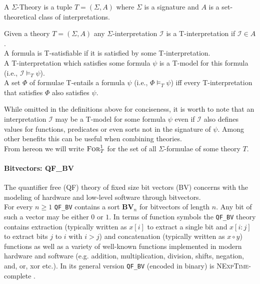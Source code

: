 \begin{definition}
A $\Sigma$-Theory is a tuple $T=\left(\Sigma,A\right)$ where $\Sigma$ is a signature and $A$ is a set-theoretical class of interpretations.
\end{definition}

\begin{definition}
Given a theory $T=\left(\Sigma,A\right)$ any $\Sigma$-interpretation $\mathcal{I}$ is a T-interpretation if $\mathcal{I}\in A$.\\
A formula is T-satisfiable if it is satisfied by some T-interpretation.\\
A T-interpretation which satisfies some formula $\psi$ is a T-model for this formula (i.e., $\mathcal{I}\vDash_T\psi$).\\
A set $\Phi$ of formulae T-entails a formula $\psi$ (i.e., $\Phi\vDash_T\psi$) iff every T-interpretation that satisfies $\Phi$ also satisfies $\psi$.
\end{definition}
While omitted in the definitions above for conciseness, it is worth to note that an interpretation $\mathcal{I}$ may be a T-model for some formula $\psi$ even if $\mathcal{I}$ also defines values for functions, predicates or even sorts not in the signature of $\psi$. Among other benefits this can be useful when combining theories.\\
From hereon we will write $\textsc{For}^1_T$ for the set of all $\Sigma$-formulae of some theory $T$.

\paragraph{Bitvectors: QF\_BV}
The quantifier free (QF) theory of fixed size bit vectors (BV) concerns with the modeling of hardware and low-level software through bitvectors.\\
For every $n\geq1$ \texttt{QF\_BV} contains a sort $\mathbf{BV}_n$ for bitvectors of length $n$. Any bit of such a vector may be either $0$ or $1$.
In terms of function symbols the \texttt{QF\_BV} theory contains extraction (typically written as $x[i]$ to extract a single bit and $x[i\colon j]$ to extract bits $j$ to $i$ with $i>j$) and concatenation (typically written as $x\circ y$) functions as well as a variety of well-known functions implemented in modern hardware and software (e.g. addition, multiplication, division, shifts, negation, and, or, xor etc.). In its general version \texttt{QF\_BV} (encoded in binary) is \textsc{NExpTime}-complete \cite{KovasznaiFroehlichBiere-SMT12}.

